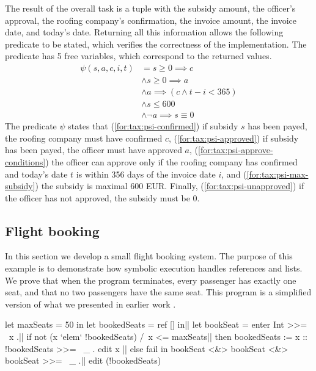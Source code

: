 The result of the overall task is a tuple with the subsidy amount, the officer's approval, the roofing company's confirmation, the invoice amount, the invoice date, and today's date.
Returning all this information allows the following predicate to be stated, which verifies the correctness of the implementation.
The predicate has 5 free variables, which correspond to the returned values.
\setcounter{equation}{0}
\begin{align}
\psi(s,a,c,i,t)
   & =      s \geq 0 \implies c \label{for:tax:psi-confirmed}
\\ & \wedge s \geq 0 \implies a \label{for:tax:psi-approved}
\\ & \wedge a \implies (c \wedge t - i < 365) \label{for:tax:psi-approve-conditions}
\\ & \wedge s \leq 600 \label{for:tax:psi-max-subsidy}
\\ & \wedge \lnot a \implies s \equiv 0 \label{for:tax:psi-unapproved}
\end{align}
The predicate $\psi$ states that (\ref{for:tax:psi-confirmed}) if subsidy $s$ has been payed, the roofing company must have confirmed $c$, (\ref{for:tax:psi-approved}) if subsidy has been payed, the officer must have approved $a$, (\ref{for:tax:psi-approve-conditions}) the officer can approve only if the roofing company has confirmed and today's date $t$ is within 356 days of the invoice date $i$, and (\ref{for:tax:psi-max-subsidy}) the subsidy is maximal 600 EUR.
Finally, (\ref{for:tax:psi-unapproved}) if the officer has not approved, the subsidy must be 0.



\subsection{Flight booking}

In this section we develop a small flight booking system.
The purpose of this example is to demonstrate how symbolic execution handles references and lists.
We prove that when the program terminates, every passenger has exactly one seat, and that no two passengers have the same seat.
This program is a simplified version of what we presented in earlier work \cite{DBLP:conf/ppdp/SteenvoordenNK19}.

\begin{TASK}[float=ht
            ,numbers=right
            ,caption=Flight booking.
            ,label=lst:flight-booking
            ]
  let maxSeats = 50 in
  let bookedSeats = ref [] in|\label{lst:flight:make-ref}|
  let bookSeat = enter Int >>= \ x .|\label{lst:flight:enter-seat-number}|
    if not (x `elem` !bookedSeats) /\ x <= maxSeats|\label{lst:flight:guard-invalid-seats}|
      then bookedSeats := x :: !bookedSeats >>= \ _ . edit x |\label{lst:flight:update-seats}|
      else fail in
  bookSeat <&> bookSeat <&> bookSeat >>= \ _ .|\label{lst:flight:main-expression}|
  edit (!bookedSeats)
\end{TASK}

